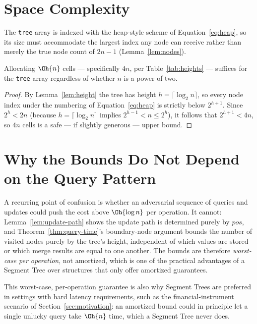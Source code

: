\section{Space Complexity}
The \texttt{tree} array is indexed with the heap-style scheme of Equation~\eqref{eq:heap}, so its size must accommodate the largest index any node can receive rather than merely the true node count of $2n-1$ (Lemma~\ref{lem:nodes}).

\begin{lem}\label{lem:space}
Allocating $\Oh{n}$ cells --- specifically $4n$, per Table~\ref{tab:heights} --- suffices for the \texttt{tree} array regardless of whether $n$ is a power of two.
\end{lem}
\begin{proof}
By Lemma~\ref{lem:height} the tree has height $h=\lceil\log_2 n\rceil$, so every node index under the numbering of Equation~\eqref{eq:heap} is strictly below $2^{h+1}$. Since $2^{h}<2n$ (because $h=\lceil\log_2 n\rceil$ implies $2^{h-1}<n\le 2^h$), it follows that $2^{h+1}<4n$, so $4n$ cells is a safe --- if slightly generous --- upper bound.
\end{proof}

\section{Why the Bounds Do Not Depend on the Query Pattern}
A recurring point of confusion is whether an adversarial sequence of queries and updates could push the cost above $\Oh{\log n}$ per operation. It cannot: Lemma~\ref{lem:update-path} shows the update path is determined purely by $pos$, and Theorem~\ref{thm:query-time}'s boundary-node argument bounds the number of visited nodes purely by the tree's height, independent of which values are stored or which merge results are equal to one another. The bounds are therefore \emph{worst-case per operation}, not amortized, which is one of the practical advantages of a Segment Tree over structures that only offer amortized guarantees.

\begin{remark}
This worst-case, per-operation guarantee is also why Segment Trees are preferred in settings with hard latency requirements, such as the financial-instrument scenario of Section~\ref{sec:motivation}: an amortized bound could in principle let a single unlucky query take $\Oh{n}$ time, which a Segment Tree never does.
\end{remark}

